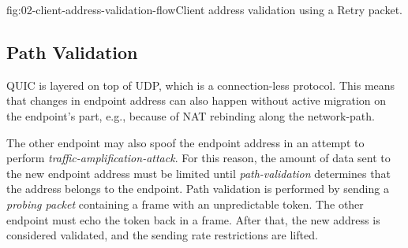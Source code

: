 \begin{myFigure}{fig:02-client-address-validation-flow}{Client address validation using a Retry
packet.}

\resizebox{\linewidth}{!}{}

\end{myFigure}

\subsection{Path Validation}\label{sec:02-path-validation}

QUIC is layered on top of UDP, which is a connection-less protocol. This means that changes in
endpoint address can also happen without active migration on the endpoint's part, e.g., because of
NAT rebinding along the \gls{network-path}.

The other endpoint may also spoof the endpoint address in an attempt to perform
\textit{\gls{traffic-amplification-attack}}. For this reason, the amount of data sent to the new
endpoint address must be limited until \textit{\gls{path-validation}} determines that the address
belongs to the endpoint. Path validation is performed by sending a \textit{probing packet}
containing a \PATHCHALLENGE{} frame with an unpredictable token. The other endpoint must echo the
token back in a \PATHRESPONSE{} frame. After that, the new address is considered validated, and the
sending rate restrictions are lifted.
